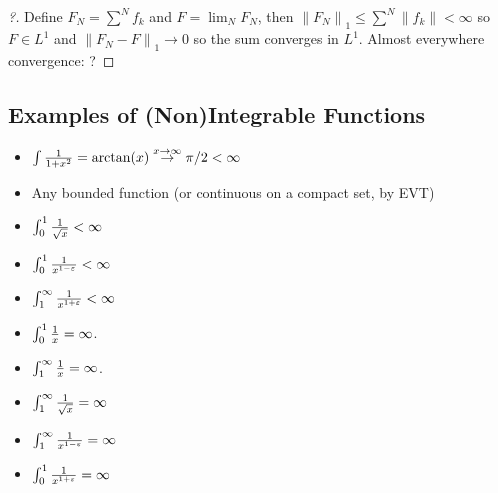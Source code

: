 \begin{proof}[?]

Define \(F_N = \sum^N f_k\) and \(F = \lim_N F_N\), then
\({\left\lVert {F_N} \right\rVert}_1 \leq \sum^N {\left\lVert {f_k} \right\rVert} < \infty\)
so \(F\in L^1\) and \({\left\lVert {F_N - F} \right\rVert}_1 \to 0\) so
the sum converges in \(L^1\). Almost everywhere convergence: ?

\end{proof}

\hypertarget{examples-of-nonintegrable-functions}{%
\subsection{Examples of (Non)Integrable
Functions}\label{examples-of-nonintegrable-functions}}

\begin{example}

\envlist

\begin{itemize}
\item
  \(\int {1\over 1 + x^2} = \arctan(x) \overset{x\to\infty}\to \pi/2 < \infty\)
\item
  Any bounded function (or continuous on a compact set, by EVT)
\item
  \(\int_0^1 {1 \over \sqrt{x}} < \infty\)
\item
  \(\int_0^1 {1\over x^{1-{\varepsilon}}} < \infty\)
\item
  \(\int_1^\infty {1\over x^{1+{\varepsilon}}} < \infty\)
\end{itemize}

\end{example}

\begin{example}

\envlist

\begin{itemize}
\tightlist
\item
  \(\int_0^1 {1\over x} = \infty\).
\item
  \(\int_1^\infty {1\over x} = \infty\).
\item
  \(\int_1^\infty {1 \over \sqrt{x}} = \infty\)
\item
  \(\int_1^\infty {1\over x^{1-{\varepsilon}}} = \infty\)
\item
  \(\int_0^1 {1\over x^{1+{\varepsilon}}} = \infty\)
\end{itemize}

\end{example}

